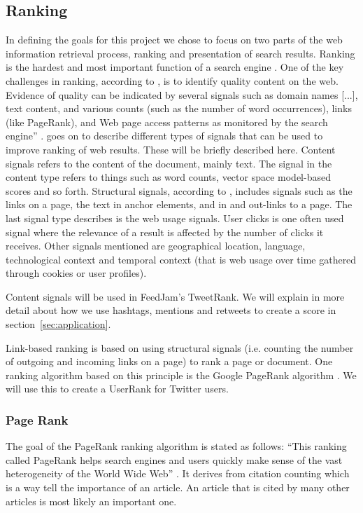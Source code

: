 \subsection{Ranking} 
In defining the goals for this project we chose to focus on two parts of the web information retrieval process, ranking and presentation of search results. Ranking is the hardest and most important function of a search engine \cite[p.469]{Baeza-Yates2011}. One of the key challenges in ranking, according to \citet{Baeza-Yates2011}, is to identify quality content on the web. Evidence of quality can be indicated by several signals such as domain names [...], text content, and various counts (such as the number of word occurrences), links (like PageRank), and Web page access patterns as monitored by the search engine” \citep[p.468]{Baeza-Yates2011}. \citet{Baeza-Yates2011} goes on to describe different types of signals that can be used to improve ranking of web results. These will be briefly described here. Content signals refers to the content of the document, mainly text. The signal in the content type refers to things such as word counts, vector space model-based scores and so forth. Structural signals, according to \citet{Baeza-Yates2011}, includes signals such as the links on a page, the text in anchor elements, and in and out-links to a page.  The last signal type describes is the web usage signals. User clicks is one often used signal where the relevance of a result is affected by the number of clicks it receives. Other signals mentioned are geographical location, language, technological context and temporal context (that is web usage over time gathered through cookies or user profiles)\citep{Baeza-Yates2011}.

Content signals will be used in FeedJam's TweetRank. We will explain in more detail about how we use hashtags, mentions and retweets to create a score in section~\ref{sec:application}.

Link-based ranking is based on using structural signals (i.e. counting the number of outgoing and incoming links on a page) to rank a page or document. One ranking algorithm based on this  principle is the Google PageRank algorithm \citep{Page1999}. We will use this to create a UserRank for Twitter users. 

\subsubsection{Page Rank}
The goal of the PageRank ranking algorithm is stated as follows: “This ranking called PageRank helps search engines and users quickly make sense of the vast heterogeneity of the World Wide Web” \citep[p. 1]{Page1999}. It derives from citation counting which is a way tell the importance of an article. An article that is cited by many other articles is most likely an important one. 


